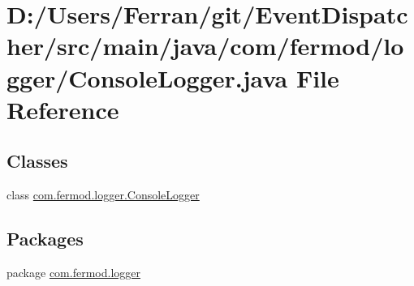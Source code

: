 \hypertarget{a00008}{}\section{D\+:/\+Users/\+Ferran/git/\+Event\+Dispatcher/src/main/java/com/fermod/logger/\+Console\+Logger.java File Reference}
\label{a00008}
\subsection*{Classes}
\begin{DoxyCompactItemize}
\item 
class \mbox{\hyperlink{a00030}{com.\+fermod.\+logger.\+Console\+Logger}}
\end{DoxyCompactItemize}
\subsection*{Packages}
\begin{DoxyCompactItemize}
\item 
package \mbox{\hyperlink{a00017}{com.\+fermod.\+logger}}
\end{DoxyCompactItemize}
